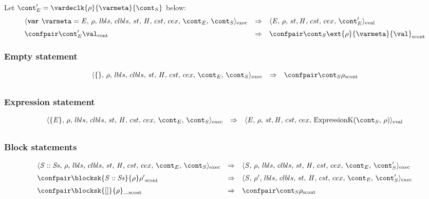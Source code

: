 \documentclass{article}
\begin{document}
\noindent
Let $\econt' = \vardeclk{\env}{\varmeta}{\scont}$ below:
\[
  \begin{array}{lcl}
	\cesktrans{
		\execconf{\textbf{var } \varmeta = \expr}{\env}{\lbls}{\clbls}{\handler}{\cstrace}{\cex}{\econt}{\scont}}{
		\evalconf{\expr}{\env}{\strace}{\cstrace}{\cex}{\econt'}}
	\\[2mm]

	\cesktrans{
		\contconf{\econt'}{\val}}{
		\scontconf{\scont}{\ext{\env}{\varmeta}{\val}}}
  \end{array}
\]

\subsubsection{Empty statement}
\label{subsubsec:emtpy-stmt}

\[
  \begin{array}{lcl}
	\cesktrans{
		\execconf{\lbrace\rbrace}{\env}{\lbls}{\clbls}{\handler}{\cstrace}{\cex}{\econt}{\scont}}{
		\scontconf{\scont}{\env}}
		\\[2mm]
  \end{array}
\]

\subsubsection{Expression statement}
\label{expression-stmt}
\newcommand{\ExpressionK}[2]{\mathrm{ExpressionK}({#1},\,{#2})}

\[
  \begin{array}{lcl}
	\cesktrans{
		\execconf{\lbrace\expr\rbrace}{\env}{\lbls}{\clbls}{\handler}{\cstrace}{\cex}{\econt}{\scont}}{
		\evalconf{\expr}{\env}{\strace}{\cstrace}{\cex}{\ExpressionK{\scont}{\env}}}
		\\[2mm]
  \end{array}
\]
\subsubsection{Block statements}
\[
  \begin{array}{lcl}
	\cesktrans{
		\execconf{\stmt :: \stmts}{\env}{\lbls}{\clbls}{\handler}{\cstrace}{\cex}{\econt}{\scont}}{
		\execconf{\stmt}{\env}{\lbls}{\clbls}{\handler}{\cstrace}{\cex}{\econt}{\scont'}}
		\\[2mm]

	\cesktrans{
		\scontconf{\blocksk{\stmt :: \stmts}{\env}}{\env'}}{
		\execconf{\stmt}{\env'}{\lbls}{\clbls}{\handler}{\cstrace}{\cex}{\econt}{\scont'}}
		\\[2mm]

	\cesktrans{
		\scontconf{\blocksk{[]}{\env}}{ \_ }}{
		\scontconf{\scont}{\env}}
		\\[2mm]
  \end{array}
\]
\end{document}
